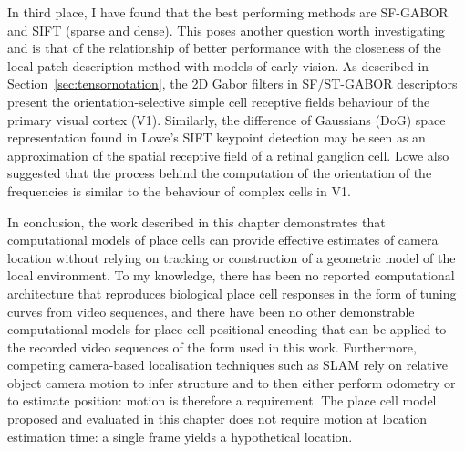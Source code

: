 In third place, I have found that the best performing methods are SF-GABOR and SIFT (sparse and dense). This poses another question worth investigating and is that of the relationship of better performance with the closeness of the local patch description method with models of early vision. As described in Section~\ref{sec:tensornotation}, the 2D Gabor filters in SF/ST-GABOR descriptors present the orientation-selective simple cell receptive fields behaviour of the primary visual cortex (V1). Similarly, the difference of Gaussians (DoG) space representation found in Lowe's SIFT keypoint detection may be seen as an approximation of the spatial receptive field of a retinal ganglion cell. Lowe also suggested that the process behind the computation of the orientation of the frequencies is similar to the behaviour of complex cells in V1.


In conclusion, the work described in this chapter demonstrates that computational models of place cells can provide effective estimates of camera location without relying on tracking or construction of a geometric model of the local environment. To my knowledge, there has been no reported computational architecture that reproduces biological place cell responses in the form of tuning curves from video sequences, and there have been no other demonstrable computational models for place cell positional encoding that can be applied to the recorded video sequences of the form used in this work.  Furthermore, competing camera-based localisation techniques such as SLAM rely on relative object camera motion to infer structure and to then either perform odometry or to estimate position: motion is therefore a requirement.  The place cell model proposed and evaluated in this chapter does not require motion at location estimation time: a single frame yields a hypothetical location.


